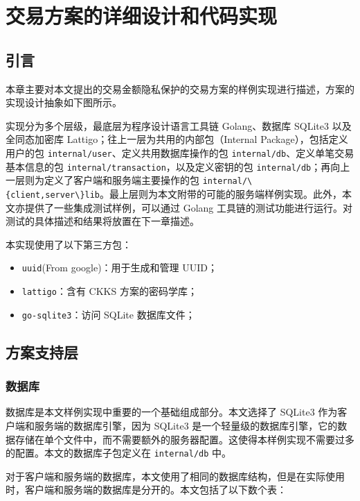 \chapter{交易方案的详细设计和代码实现}

\section{引言}

本章主要对本文提出的交易金额隐私保护的交易方案的样例实现进行描述，方案的实现设计抽象如下图所示。


实现分为多个层级，最底层为程序设计语言工具链 Golang、数据库 SQLite3 以及全同态加密库 Lattigo；往上一层为共用的内部包（Internal Package），包括定义用户的包 \verb|internal/user|、定义共用数据库操作的包 \verb|internal/db|、定义单笔交易基本信息的包 \verb|internal/transaction|，以及定义密钥的包 \verb|internal/db|；再向上一层则为定义了客户端和服务端主要操作的包 \verb|internal/\{client,server\}lib|。最上层则为本文附带的可能的服务端样例实现。此外，本文亦提供了一些集成测试样例，可以通过 Golang 工具链的测试功能进行运行。对测试的具体描述和结果将放置在下一章描述。

本实现使用了以下第三方包：

\begin{itemize}
    \item \verb|uuid|(From google)：用于生成和管理 UUID；
    \item \verb|lattigo|：含有 CKKS 方案的密码学库；
    \item \verb|go-sqlite3|：访问 SQLite 数据库文件；
\end{itemize}

\section{方案支持层}

\subsection{数据库}

数据库是本文样例实现中重要的一个基础组成部分。本文选择了 SQLite3 作为客户端和服务端的数据库引擎，因为 SQLite3 是一个轻量级的数据库引擎，它的数据存储在单个文件中，而不需要额外的服务器配置。这使得本样例实现不需要过多的配置。本文的数据库子包定义在 \verb|internal/db| 中。

对于客户端和服务端的数据库，本文使用了相同的数据库结构，但是在实际使用时，客户端和服务端的数据库是分开的。本文包括了以下数个表：

